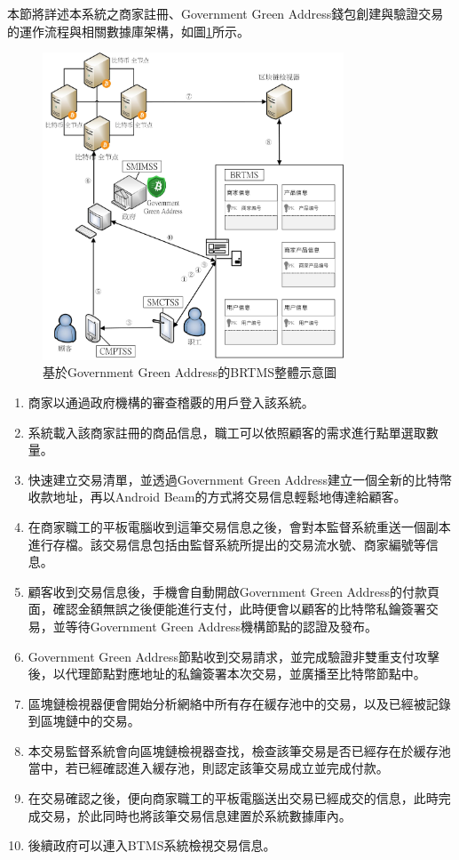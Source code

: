 本節將詳述本系統之商家註冊、Government Green Address錢包創建與驗證交易的運作流程與相關數據庫架構，如圖\ref{gabpcss}所示。

	\begin{figure}[!htbp]
		\centering
		\includegraphics[width = 0.8\textwidth]{gabpcss.jpg}
		\caption{基於Government Green Address的BRTMS整體示意圖}\label{gabpcss}
	\end{figure}

	\begin{enumerate}
		\item 商家以通過政府機構的審查稽覈的用戶登入該系統。
		\item 系統載入該商家註冊的商品信息，職工可以依照顧客的需求進行點單選取數量。
		\item 快速建立交易清單，並透過Government Green Address建立一個全新的比特幣收款地址，再以Android Beam的方式將交易信息輕鬆地傳達給顧客。
		\item 在商家職工的平板電腦收到這筆交易信息之後，會對本監督系統重送一個副本進行存檔。該交易信息包括由監督系統所提出的交易流水號、商家編號等信息。
		\item 顧客收到交易信息後，手機會自動開啟Government Green Address的付款頁面，確認金額無誤之後便能進行支付，此時便會以顧客的比特幣私鑰簽署交易，並等待Government Green Address機構節點的認證及發布。
		\item Government Green Address節點收到交易請求，並完成驗證非雙重支付攻擊後，以代理節點對應地址的私鑰簽署本次交易，並廣播至比特幣節點中。
		\item 區塊鏈檢視器便會開始分析網絡中所有存在緩存池中的交易，以及已經被記錄到區塊鏈中的交易。
		\item 本交易監督系統會向區塊鏈檢視器查找，檢查該筆交易是否已經存在於緩存池當中，若已經確認進入緩存池，則認定該筆交易成立並完成付款。
		\item 在交易確認之後，便向商家職工的平板電腦送出交易已經成交的信息，此時完成交易，於此同時也將該筆交易信息建置於系統數據庫內。
		\item 後續政府可以連入BTMS系統檢視交易信息。
	\end{enumerate}